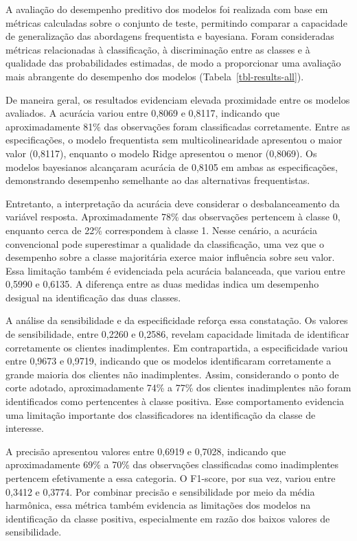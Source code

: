 \documentclass[
  brazilian,
  12pt,
  letterpaper,
  DIV=11,
  numbers=noendperiod]{scrartcl}
\begin{document}
A avaliação do desempenho preditivo dos modelos foi realizada com base
em métricas calculadas sobre o conjunto de teste, permitindo comparar a
capacidade de generalização das abordagens frequentista e bayesiana.
Foram consideradas métricas relacionadas à classificação, à
discriminação entre as classes e à qualidade das probabilidades
estimadas, de modo a proporcionar uma avaliação mais abrangente do
desempenho dos modelos (Tabela~\ref{tbl-results-all}).

De maneira geral, os resultados evidenciam elevada proximidade entre os
modelos avaliados. A acurácia variou entre 0,8069 e 0,8117, indicando
que aproximadamente 81\% das observações foram classificadas
corretamente. Entre as especificações, o modelo frequentista sem
multicolinearidade apresentou o maior valor (0,8117), enquanto o modelo
Ridge apresentou o menor (0,8069). Os modelos bayesianos alcançaram
acurácia de 0,8105 em ambas as especificações, demonstrando desempenho
semelhante ao das alternativas frequentistas.

Entretanto, a interpretação da acurácia deve considerar o
desbalanceamento da variável resposta. Aproximadamente 78\% das
observações pertencem à classe 0, enquanto cerca de 22\% correspondem à
classe 1. Nesse cenário, a acurácia convencional pode superestimar a
qualidade da classificação, uma vez que o desempenho sobre a classe
majoritária exerce maior influência sobre seu valor. Essa limitação
também é evidenciada pela acurácia balanceada, que variou entre 0,5990 e
0,6135. A diferença entre as duas medidas indica um desempenho desigual
na identificação das duas classes.

A análise da sensibilidade e da especificidade reforça essa constatação.
Os valores de sensibilidade, entre 0,2260 e 0,2586, revelam capacidade
limitada de identificar corretamente os clientes inadimplentes. Em
contrapartida, a especificidade variou entre 0,9673 e 0,9719, indicando
que os modelos identificaram corretamente a grande maioria dos clientes
não inadimplentes. Assim, considerando o ponto de corte adotado,
aproximadamente 74\% a 77\% dos clientes inadimplentes não foram
identificados como pertencentes à classe positiva. Esse comportamento
evidencia uma limitação importante dos classificadores na identificação
da classe de interesse.

A precisão apresentou valores entre 0,6919 e 0,7028, indicando que
aproximadamente 69\% a 70\% das observações classificadas como
inadimplentes pertencem efetivamente a essa categoria. O F1-score, por
sua vez, variou entre 0,3412 e 0,3774. Por combinar precisão e
sensibilidade por meio da média harmônica, essa métrica também evidencia
as limitações dos modelos na identificação da classe positiva,
especialmente em razão dos baixos valores de sensibilidade.
\end{document}
